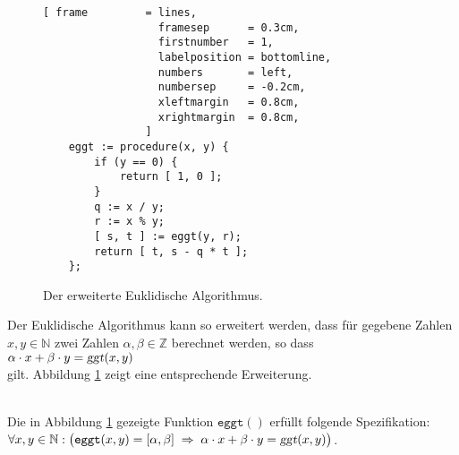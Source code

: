 \begin{figure}[!ht]
\centering
\begin{Verbatim}[ frame         = lines, 
                  framesep      = 0.3cm, 
                  firstnumber   = 1,
                  labelposition = bottomline,
                  numbers       = left,
                  numbersep     = -0.2cm,
                  xleftmargin   = 0.8cm,
                  xrightmargin  = 0.8cm,
                ]
    eggt := procedure(x, y) {
        if (y == 0) {
            return [ 1, 0 ];
        }
        q := x / y;
        r := x % y;
        [ s, t ] := eggt(y, r);
        return [ t, s - q * t ]; 
    };
\end{Verbatim}
\vspace*{-0.3cm}
\caption{Der erweiterte Euklidische Algorithmus.}
\label{fig:eggt.stlx}
\end{figure}

Der Euklidische Algorithmus kann so erweitert werden, dass f\"{u}r gegebene Zahlen $x,y \in \mathbb{N}$
zwei Zahlen $\alpha,\beta \in \mathbb{Z}$ berechnet werden, so dass 
\\[0.2cm]
\hspace*{1.3cm}
$\alpha \cdot x + \beta \cdot y = \textsl{ggt}(x, y)$
\\[0.2cm]
gilt.  Abbildung \ref{fig:eggt.stlx} zeigt eine entsprechende Erweiterung.

\begin{Satz} \hspace*{\fill} \\ 
  Die in Abbildung \ref{fig:eggt.stlx} gezeigte Funktion $\texttt{eggt}()$ erf\"{u}llt
  folgende Spezifikation:
  \\[0.2cm]
  \hspace*{1.3cm}
  $\forall x, y \in \mathbb{N}: \bigl(
   \mathtt{eggt}(x, y) = [ \alpha, \beta ] \;\Rightarrow\; 
   \alpha \cdot x + \beta \cdot y = \textsl{ggt}(x,y)\bigr)
  $.
\end{Satz}


